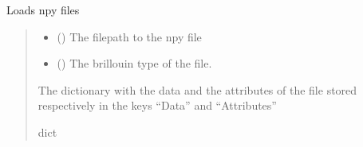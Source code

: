 \documentclass[letterpaper,10pt,english]{sphinxmanual}
\begin{document}

\begin{fulllineitems}
\label{\detokenize{source/HDF5_BLS:HDF5_BLS.load_data.load_npy_file}}
\pysigstartsignatures
\pysiglinewithargsret
{}
{\sphinxparamcomma {}}
{}
\pysigstopsignatures
\sphinxAtStartPar
Loads npy files
\begin{quote}\begin{description}
\begin{itemize}
\item {} 
\sphinxAtStartPar
{} () \textendash{} The filepath to the npy file

\item {} 
\sphinxAtStartPar
{} (\sphinxstyleliteralemphasis{\sphinxupquote{, }}) \textendash{} The brillouin type of the file.

\end{itemize}

\sphinxAtStartPar
The dictionary with the data and the attributes of the file stored respectively in the keys “Data” and “Attributes”

\sphinxAtStartPar
dict

\end{description}\end{quote}

\end{fulllineitems}

\end{document}

